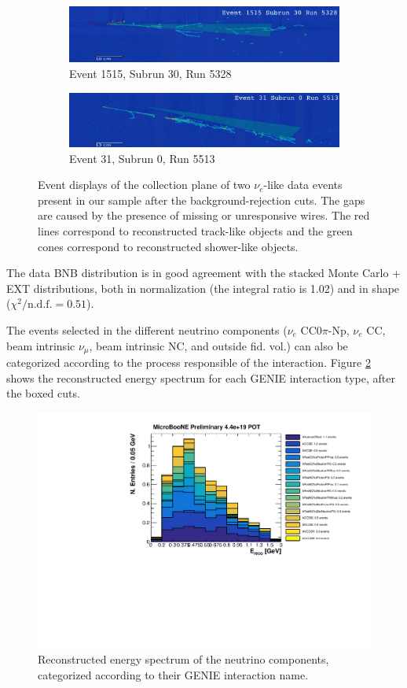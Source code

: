 \begin{figure}[htbp]
\centering
  \begin{subfigure}{0.7\textwidth}
  \includegraphics[width=\linewidth]{figures/data1.png}
    \caption{Event 1515, Subrun 30, Run 5328}
\end{subfigure}
  \begin{subfigure}{0.7\textwidth}	
  \includegraphics[width=\linewidth]{figures/data2.png}
  \caption{Event 31, Subrun 0, Run 5513}
\end{subfigure}

  \caption{Event displays of the collection plane of two $\nu_{e}$-like data events present in our sample after the background-rejection cuts. The gaps are caused by the presence of missing or unresponsive wires. The red lines correspond to reconstructed track-like objects and the green cones correspond to reconstructed shower-like objects. }
  \label{fig:evds}
\end{figure}

The data BNB distribution is in good agreement with the stacked Monte Carlo + EXT distributions, both in normalization (the integral ratio is 1.02) and in shape ($\chi^2 /\mathrm{n.d.f.} = 0.51$). 

The events selected in the different neutrino components ($\nu_{e}$ CC0$\pi$-Np, $\nu_{e}$ CC, beam intrinsic $\nu_{\mu}$, beam intrinsic NC, and outside fid. vol.) can also be categorized according to the process responsible of the interaction. Figure \ref{fig:interactions} shows the reconstructed energy spectrum for each GENIE interaction type, after the boxed cuts. 

\begin{figure}[htbp]
\centering
  \includegraphics[width=0.65\linewidth]{figures/h_interactions.pdf}
    \caption{Reconstructed energy spectrum of the neutrino components, categorized according to their GENIE interaction name.}\label{fig:interactions}

\end{figure}

